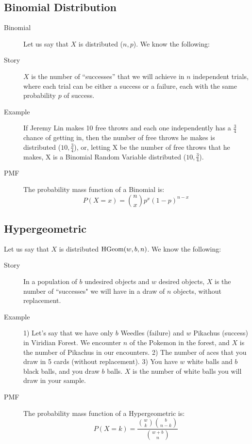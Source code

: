 \documentclass[11pt]{article}
\begin{document}
\begin{notes}
\section*{Binomial Distribution}
\begin{description}
    \item[Binomial] Let us say that $X$ is distributed \Bin($n,p$). We know the following:
	\item[Story] $X$ is the number of ``successes'' that we will achieve in $n$ independent trials, where each trial can be either a success or a failure, each with the same probability $p$ of success.
	\item[Example] If Jeremy Lin makes 10 free throws and each one independently has a $\frac{3}{4}$ chance of getting in, then the number of free throws he makes is distributed  \Bin($10,\frac{3}{4}$), or, letting X be the number of free throws that he makes, X is a Binomial Random Variable distributed  \Bin($10,\frac{3}{4}$).
	\item[PMF] The probability mass function of a Binomial is:
\[P(X = x) = {n  \choose x} p^x(1-p)^{n-x}\]
\end{description}

\subsection*{Hypergeometric}
Let us say that $X$ is distributed $\textrm{HGeom}(w, b, n)$. We know the following:
\begin{description}
	\item[Story] In a population of $b$ undesired objects and $w$ desired objects, $X$ is the number of ``successes" we will have in a draw of $n$ objects, without replacement.
	\item[Example] 1) Let's say that we have only $b$ Weedles (failure) and $w$ Pikachus (success) in Viridian Forest. We encounter $n$ of the Pokemon in the forest, and $X$ is the number of Pikachus in our encounters. 2) The number of aces that you draw in 5 cards (without replacement). 3) You have $w$ white balls and $b$ black balls, and you draw $b$ balls. $X$ is the number of white balls you will draw in your sample. 
	\item[PMF] The probability mass function of a Hypergeometric is:
\[P(X = k) = \frac{{w \choose k}{b \choose n-k}}{{w + b \choose n}}\]
\end{description}


\end{notes}
\end{document}
